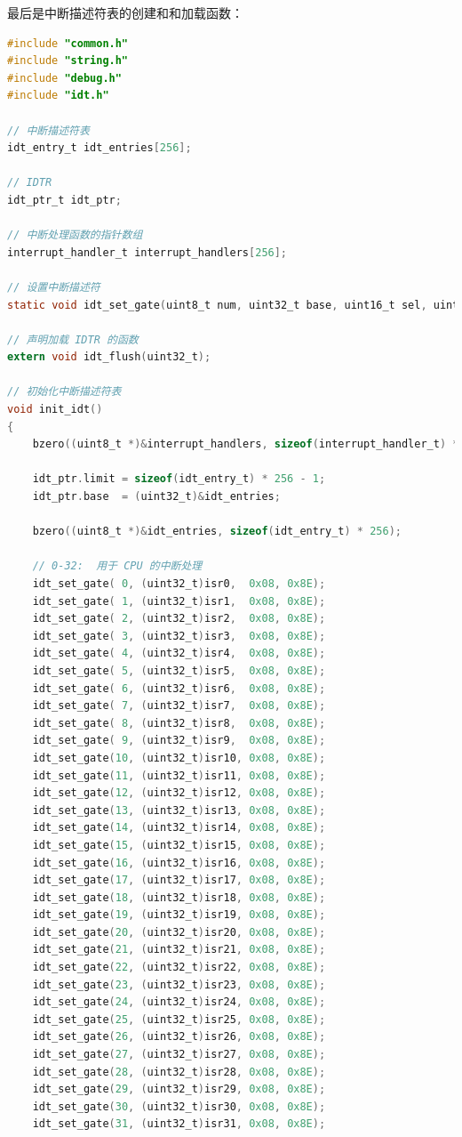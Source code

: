 \par 最后是中断描述符表的创建和和加载函数：
\begin{lstlisting}[language = C, caption = gdt/gdt.c]
#include "common.h"
#include "string.h"
#include "debug.h"
#include "idt.h"

// 中断描述符表
idt_entry_t idt_entries[256];

// IDTR
idt_ptr_t idt_ptr;

// 中断处理函数的指针数组
interrupt_handler_t interrupt_handlers[256];

// 设置中断描述符
static void idt_set_gate(uint8_t num, uint32_t base, uint16_t sel, uint8_t flags);

// 声明加载 IDTR 的函数
extern void idt_flush(uint32_t);

// 初始化中断描述符表
void init_idt()
{	
	bzero((uint8_t *)&interrupt_handlers, sizeof(interrupt_handler_t) * 256);
	
	idt_ptr.limit = sizeof(idt_entry_t) * 256 - 1;
	idt_ptr.base  = (uint32_t)&idt_entries;
	
	bzero((uint8_t *)&idt_entries, sizeof(idt_entry_t) * 256);

	// 0-32:  用于 CPU 的中断处理
	idt_set_gate( 0, (uint32_t)isr0,  0x08, 0x8E);
	idt_set_gate( 1, (uint32_t)isr1,  0x08, 0x8E);
	idt_set_gate( 2, (uint32_t)isr2,  0x08, 0x8E);
	idt_set_gate( 3, (uint32_t)isr3,  0x08, 0x8E);
	idt_set_gate( 4, (uint32_t)isr4,  0x08, 0x8E);
	idt_set_gate( 5, (uint32_t)isr5,  0x08, 0x8E);
	idt_set_gate( 6, (uint32_t)isr6,  0x08, 0x8E);
	idt_set_gate( 7, (uint32_t)isr7,  0x08, 0x8E);
	idt_set_gate( 8, (uint32_t)isr8,  0x08, 0x8E);
	idt_set_gate( 9, (uint32_t)isr9,  0x08, 0x8E);
	idt_set_gate(10, (uint32_t)isr10, 0x08, 0x8E);
	idt_set_gate(11, (uint32_t)isr11, 0x08, 0x8E);
	idt_set_gate(12, (uint32_t)isr12, 0x08, 0x8E);
	idt_set_gate(13, (uint32_t)isr13, 0x08, 0x8E);
	idt_set_gate(14, (uint32_t)isr14, 0x08, 0x8E);
	idt_set_gate(15, (uint32_t)isr15, 0x08, 0x8E);
	idt_set_gate(16, (uint32_t)isr16, 0x08, 0x8E);
	idt_set_gate(17, (uint32_t)isr17, 0x08, 0x8E);
	idt_set_gate(18, (uint32_t)isr18, 0x08, 0x8E);
	idt_set_gate(19, (uint32_t)isr19, 0x08, 0x8E);
	idt_set_gate(20, (uint32_t)isr20, 0x08, 0x8E);
	idt_set_gate(21, (uint32_t)isr21, 0x08, 0x8E);
	idt_set_gate(22, (uint32_t)isr22, 0x08, 0x8E);
	idt_set_gate(23, (uint32_t)isr23, 0x08, 0x8E);
	idt_set_gate(24, (uint32_t)isr24, 0x08, 0x8E);
	idt_set_gate(25, (uint32_t)isr25, 0x08, 0x8E);
	idt_set_gate(26, (uint32_t)isr26, 0x08, 0x8E);
	idt_set_gate(27, (uint32_t)isr27, 0x08, 0x8E);
	idt_set_gate(28, (uint32_t)isr28, 0x08, 0x8E);
	idt_set_gate(29, (uint32_t)isr29, 0x08, 0x8E);
	idt_set_gate(30, (uint32_t)isr30, 0x08, 0x8E);
	idt_set_gate(31, (uint32_t)isr31, 0x08, 0x8E);


\end{lstlisting}
